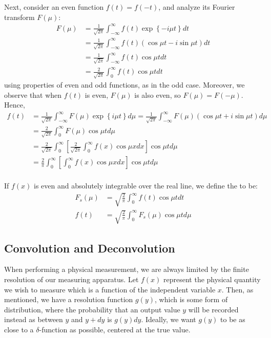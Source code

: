 \documentclass[12pt, a4paper, oneside, openright, titlepage]{book}
\begin{document}
Next, consider an even function $f(t) = f(-t)$, and analyze its Fourier transform $F(\mu)$: \begin{align*}
    F(\mu) &= \frac{1}{\sqrt{2\pi}}\int_{-\infty}^{\infty}f(t)\exp\left\{-i\mu t\right\}dt \\
    &=\frac{1}{\sqrt{2\pi}}\int_{-\infty}^{\infty}f(t)(\cos\mu t - i\sin\mu t)dt \\
    &= \frac{1}{\sqrt{2\pi}}\int_{-\infty}^{\infty}f(t)\cos\mu tdt \\
    &= \frac{2}{\sqrt{2\pi}}\int_0^{\infty}f(t)\cos\mu tdt
\end{align*}
using properties of even and odd functions, as in the odd case. Moreover, we observe that when $f(t)$ is even, $F(\mu)$ is also even, so $F(\mu) = F(-\mu)$. Hence, \begin{align*}
    f(t) &= \frac{1}{\sqrt{2\pi}}\int_{-\infty}^{\infty}F(\mu)\exp\left\{i\mu t\right\}d\mu = \frac{1}{\sqrt{2\pi}}\int_{-\infty}^{\infty}F(\mu)(\cos \mu t+i\sin\mu t)d\mu \\
    &= \frac{2}{\sqrt{2\pi}}\int_0^{\infty}F(\mu)\cos\mu td\mu \\
    &= \frac{2}{\sqrt{2\pi}}\int_0^{\infty}\left[\frac{2}{\sqrt{2\pi}}\int_0^{\infty}f(x)\cos\mu xdx\right]\cos\mu td\mu \\
    &= \frac{2}{\pi}\int_0^{\infty}\left[\int_0^{\infty}f(x)\cos\mu xdx\right]\cos\mu td\mu \\
\end{align*}

\begin{defn}
    If $f(x)$ is even and absolutely integrable over the real line, we define the  to be: \begin{align}
        F_s(\mu) &= \sqrt{\frac{2}{\pi}}\int_0^{\infty}f(t)\cos\mu tdt \\
        f(t) &= \sqrt{\frac{2}{\pi}}\int_0^{\infty}F_s(\mu)\cos\mu td\mu
    \end{align}
\end{defn}

\subsection{Convolution and Deconvolution}


When performing a physical measurement, we are always limited by the finite resolution of our measuring apparatus. Let $f(x)$ represent the physical quantity we wish to measure which is a function of the independent variable $x$. Then, as mentioned, we have a resolution function $g(y)$, which is some form of distribution, where the probability that an output value $y$ will be recorded instead as between $y$ and $y+dy$ is $g(y)dy$. Ideally, we want $g(y)$ to be as close to a $\delta$-function as possible, centered at the true value. 
\end{document}
